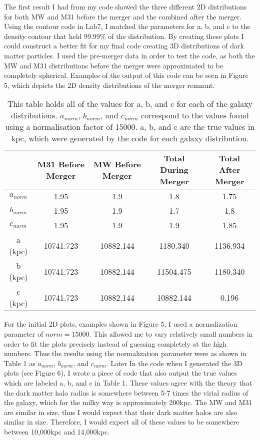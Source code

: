 \documentclass{aastex63}
\begin{document}
The first result I had from my code showed the three different 2D distributions for both MW and M31 before the merger and the combined after the merger. Using the contour code in Lab7, I matched the parameters for a, b, and c to the density contour that held 99.99\% of the distribution. By creating these plots I could construct a better fit for my final code creating 3D distributions of dark matter particles. I used the pre-merger data in order to test the code, as both the MW and M31 distributions before the merger were approximated to be completely spherical. Examples of the output of this code can be seen in Figure 5, which depicts the 2D density distributions of the merger remnant. 
\vspace{4mm}
\begin{table}[h!]
\begin{tabular}{| c | c | c | c | c |}
 \hline
  & M31 Before Merger  & MW Before Merger & Total During Merger & Total After Merger \\ 
 \hline\hline
 $a_{norm}$ & 1.95 & 1.9 & 1.8 & 1.75 \\ 
 \hline
 $b_{norm}$ & 1.95 & 1.9 & 1.7 & 1.8 \\
 \hline
 $c_{norm}$ & 1.95 & 1.9 & 1.9 & 1.85 \\
 \hline
 a (kpc) & 10741.723 & 10882.144 & 1180.340 & 1136.934 \\ 
 \hline
 b (kpc) & 10741.723 & 10882.144 & 11504.475 & 1180.340 \\
 \hline
 c (kpc) & 10741.723 & 10882.144 & 10882.144 & 0.196 \\
 \hline
\end{tabular}
\caption{This table holds all of the values for a, b, and c for each of the galaxy distributions. $a_{norm}$, $b_{norm}$, and $c_{norm}$ correspond to the values found using a normalisation factor of 15000. a, b, and c are the true values in kpc, which were generated by the code for each galaxy distribution.}
\end{table}

For the initial 2D plots, examples shown in Figure 5, I used a normalization parameter of $norm=15000$. This allowed me to vary relatively small numbers in order to fit the plots precisely instead of guessing completely at the high numbers. Thus the results using the normalization parameter were as shown in Table 1 as $a_{norm}$, $b_{norm}$, and $c_{norm}$. Later In the code when I generated the 3D plots (see Figure 6), I wrote a piece of code that also output the true values which are labeled a, b, and c in Table 1. These values agree with the theory that the dark matter halo radius is somewhere between 5-7 times the virial radius of the galaxy\cite{Prada_2006}, which for the milky way is approximately 200kpc. The MW and M31 are similar in size, thus I would expect that their dark matter halos are also similar in size. Therefore, I would expect all of these values to be somewhere between 10,000kpc and 14,000kpc. 
\end{document}
